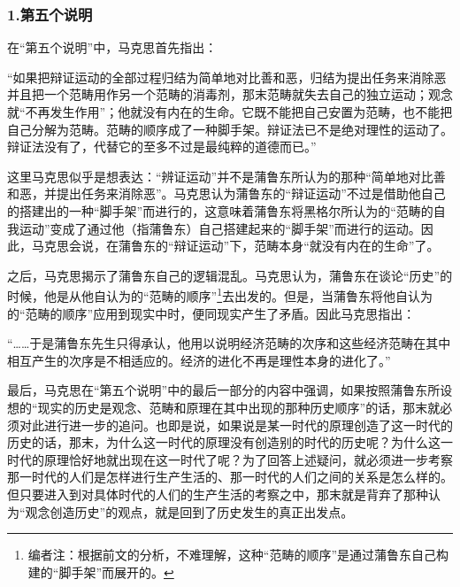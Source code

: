\documentclass[a4paper,twoside,12pt,AutoFakeBold]{ctexart}
\begin{document}
\subsubsection{1.第五个说明}

在“第五个说明”中，马克思首先指出：
\begin{adjustwidth}{2em}{2em}
    \qquad\fangsong
    “如果把辩证运动的全部过程归结为简单地对比善和恶，归结为提出任务来消除恶并且把一个范畴用作另一个范畴的消毒剂，那末范畴就失去自己的独立运动；观念就“不再发生作用”；他就没有内在的生命。它既不能把自己安置为范畴，也不能把自己分解为范畴。范畴的顺序成了一种脚手架。辩证法已不是绝对理性的运动了。辩证法没有了，代替它的至多不过是最纯粹的道德而已。”
\end{adjustwidth}

这里马克思似乎是想表达：“辨证运动”并不是蒲鲁东所认为的那种“简单地对比善和恶，并提出任务来消除恶”。马克思认为蒲鲁东的“辩证运动”不过是借助他自己的搭建出的一种“脚手架”而进行的，这意味着蒲鲁东将黑格尔所认为的“范畴的自我运动”变成了通过他（指蒲鲁东）自己搭建起来的“脚手架”而进行的运动。因此，马克思会说，在蒲鲁东的“辩证运动”下，范畴本身“就没有内在的生命”了。

之后，马克思揭示了蒲鲁东自己的逻辑混乱。马克思认为，蒲鲁东在谈论“历史”的时候，他是从他自认为的“范畴的顺序”\footnote{编者注：根据前文的分析，不难理解，这种“范畴的顺序”是通过蒲鲁东自己构建的“脚手架”而展开的。}去出发的。但是，当蒲鲁东将他自认为的“范畴的顺序”应用到现实中时，便同现实产生了矛盾。因此马克思指出：
\begin{adjustwidth}{2em}{2em}
    \qquad\fangsong
    “……于是蒲鲁东先生只得承认，他用以说明经济范畴的次序和这些经济范畴在其中相互产生的次序是不相适应的。经济的进化不再是理性本身的进化了。”
\end{adjustwidth}

最后，马克思在“第五个说明”中的最后一部分的内容中强调，如果按照蒲鲁东所设想的“现实的历史是观念、范畴和原理在其中出现的那种历史顺序”的话，那末就必须对此进行进一步的追问。也即是说，如果说是某一时代的原理创造了这一时代的历史的话，那末，为什么这一时代的原理没有创造别的时代的历史呢？为什么这一时代的原理恰好地就出现在这一时代了呢？为了回答上述疑问，就必须进一步考察那一时代的人们是怎样进行生产生活的、那一时代的人们之间的关系是怎么样的。但只要进入到对具体时代的人们的生产生活的考察之中，那末就是背弃了那种认为“观念创造历史”的观点，就是回到了历史发生的真正出发点。
\end{document}
